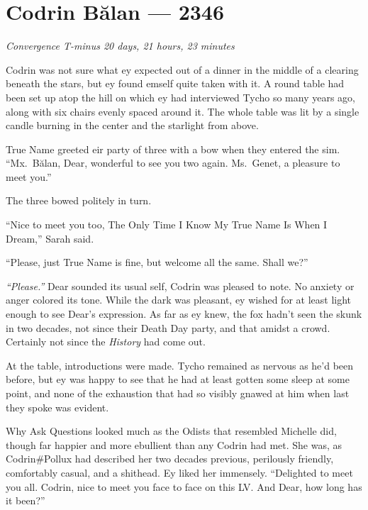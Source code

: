 \hypertarget{codrin-bux103lan-2346}{%
\chapter{Codrin Bălan — 2346}}

\begin{center}
\emph{Convergence T-minus 20 days, 21 hours, 23 minutes}
\end{center}

\noindent Codrin was not sure what ey expected out of a dinner in the middle of a clearing beneath the stars, but ey found emself quite taken with it. A round table had been set up atop the hill on which ey had interviewed Tycho so many years ago, along with six chairs evenly spaced around it. The whole table was lit by a single candle burning in the center and the starlight from above.

True Name greeted eir party of three with a bow when they entered the sim. ``Mx.~Bălan, Dear, wonderful to see you two again. Ms.~Genet, a pleasure to meet you.''

The three bowed politely in turn.

``Nice to meet you too, The Only Time I Know My True Name Is When I Dream,'' Sarah said.

``Please, just True Name is fine, but welcome all the same. Shall we?''

\emph{``Please.''} Dear sounded its usual self, Codrin was pleased to note. No anxiety or anger colored its tone. While the dark was pleasant, ey wished for at least light enough to see Dear's expression. As far as ey knew, the fox hadn't seen the skunk in two decades, not since their Death Day party, and that amidst a crowd. Certainly not since the \emph{History} had come out.

At the table, introductions were made. Tycho remained as nervous as he'd been before, but ey was happy to see that he had at least gotten some sleep at some point, and none of the exhaustion that had so visibly gnawed at him when last they spoke was evident.

Why Ask Questions looked much as the Odists that resembled Michelle did, though far happier and more ebullient than any Codrin had met. She was, as Codrin\#Pollux had described her two decades previous, perilously friendly, comfortably casual, and a shithead. Ey liked her immensely. ``Delighted to meet you all. Codrin, nice to meet you face to face on this LV. And Dear, how long has it been?''

